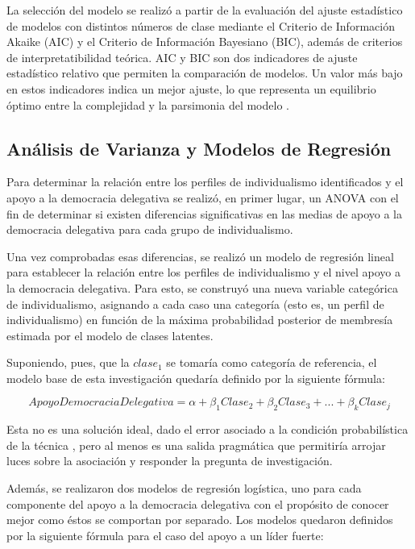 \documentclass[12pt,twoside]{templates/facsothesis}
\begin{document}
La selección del modelo se realizó a partir de la evaluación del ajuste estadístico de modelos con distintos números de clase mediante el Criterio de Información Akaike (AIC) y el Criterio de Información Bayesiano (BIC), además de criterios de interpretatibilidad teórica. AIC y BIC son dos indicadores de ajuste estadístico relativo que permiten la comparación de modelos. Un valor más bajo en estos indicadores indica un mejor ajuste, lo que representa un equilibrio óptimo entre la complejidad y la parsimonia del modelo \citep{collins2010}.

\hypertarget{anuxe1lisis-de-varianza-y-modelos-de-regresiuxf3n}{%
\subsection*{Análisis de Varianza y Modelos de Regresión}\label{anuxe1lisis-de-varianza-y-modelos-de-regresiuxf3n}}

Para determinar la relación entre los perfiles de individualismo identificados y el apoyo a la democracia delegativa se realizó, en primer lugar, un ANOVA con el fin de determinar si existen diferencias significativas en las medias de apoyo a la democracia delegativa para cada grupo de individualismo.

Una vez comprobadas esas diferencias, se realizó un modelo de regresión lineal para establecer la relación entre los perfiles de individualismo y el nivel apoyo a la democracia delegativa. Para esto, se construyó una nueva variable categórica de individualismo, asignando a cada caso una categoría (esto es, un perfil de individualismo) en función de la máxima probabilidad posterior de membresía estimada por el modelo de clases latentes.

Suponiendo, pues, que la \(clase_1\) se tomaría como categoría de referencia, el modelo base de esta investigación quedaría definido por la siguiente fórmula:

\[Apoyo Democracia Delegativa = \alpha + \beta_1Clase_2 + \beta_2Clase_3 + ... + \beta_kClase_j \]

Esta no es una solución ideal, dado el error asociado a la condición probabilística de la técnica \citep{collins2010}, pero al menos es una salida pragmática que permitiría arrojar luces sobre la asociación y responder la pregunta de investigación.

Además, se realizaron dos modelos de regresión logística, uno para cada componente del apoyo a la democracia delegativa con el propósito de conocer mejor como éstos se comportan por separado. Los modelos quedaron definidos por la siguiente fórmula para el caso del apoyo a un líder fuerte:
\end{document}
